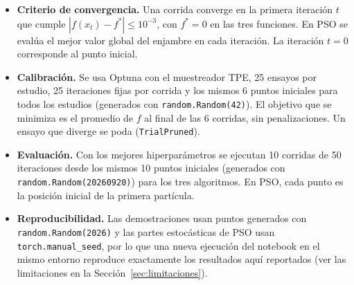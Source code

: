 \begin{itemize}
    \item \textbf{Criterio de convergencia.} Una corrida converge en la
    primera iteración $t$ que cumple $|f(x_t)-f^*|\leq10^{-3}$, con
    $f^*=0$ en las tres funciones. En PSO se evalúa el mejor valor global
    del enjambre en cada iteración. La iteración $t=0$ corresponde al punto
    inicial.
    \item \textbf{Calibración.} Se usa Optuna \cite{akiba2019optuna} con el
    muestreador TPE, 25 ensayos por estudio, 25 iteraciones fijas por
    corrida y los mismos 6 puntos iniciales para todos los estudios
    (generados con \texttt{random.Random(42)}). El objetivo que se minimiza
    es el promedio de $f$ al final de las 6 corridas, sin penalizaciones.
    Un ensayo que diverge se poda (\texttt{TrialPruned}).
    \item \textbf{Evaluación.} Con los mejores hiperparámetros se ejecutan
    10 corridas de 50 iteraciones desde los mismos 10 puntos iniciales
    (generados con \texttt{random.Random(20260920)}) para los tres
    algoritmos. En PSO, cada punto es la posición inicial de la primera
    partícula.
    \item \textbf{Reproducibilidad.} Las demostraciones usan puntos generados
    con \texttt{random.Random(2026)} y las partes estocásticas de PSO usan
    \texttt{torch.manual\_seed}, por lo que una nueva ejecución del notebook en
    el mismo entorno reproduce exactamente los resultados aquí reportados
    (ver las limitaciones en la Sección~\ref{sec:limitaciones}).
\end{itemize}
